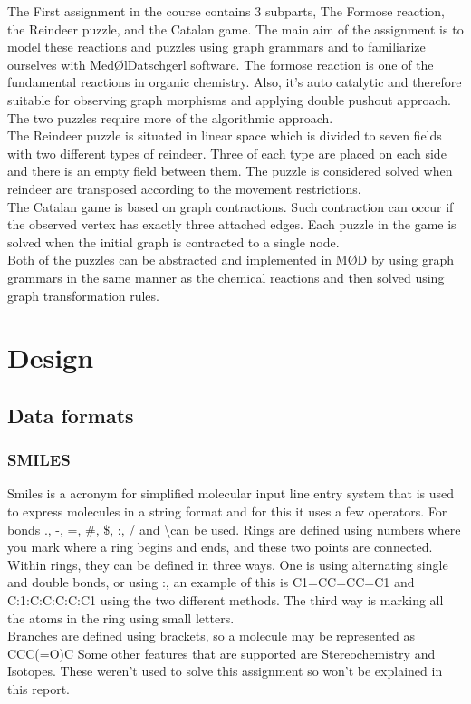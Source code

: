 \documentclass[a4paper,10pt,titlepage]{report}
\begin{document}
The First assignment in the course contains 3 subparts, The Formose reaction, the Reindeer puzzle, and the Catalan game. The main aim of the assignment is to model these reactions and puzzles using graph grammars and to familiarize ourselves with MedØlDatschgerl software.
\newline
The formose reaction is one of the fundamental reactions in organic chemistry. Also, it's auto catalytic and therefore suitable for observing graph morphisms and applying double pushout approach. The two puzzles require more of the algorithmic approach.
\\
The Reindeer puzzle is situated in linear space which is divided to seven fields with two different types of reindeer. Three of each type are placed on each side and there is an empty field between them. The puzzle is considered solved when reindeer are transposed according to the movement restrictions.
\\
The Catalan game is based on graph contractions. Such contraction can occur if the observed vertex has exactly three attached edges. Each puzzle in the game is solved when the initial graph is contracted to a single node.
\\
Both of the puzzles can be abstracted and implemented in MØD by using graph grammars in the same manner as the chemical reactions and then solved using graph transformation rules. 
\\

\section{Design}
\subsection{Data formats}
\subsubsection{SMILES}
Smiles is a acronym for simplified molecular input line entry system that is used to express molecules in a string format and for this it uses a few operators. For bonds ., -, =, #, \$, :, / and \textbackslash can be used.
Rings are defined using numbers where you mark where a ring begins and ends, and these two points are connected. Within rings, they can be defined in three ways. One is using alternating single and double bonds, or using :, an example of this is  C1=CC=CC=C1 and C:1:C:C:C:C:C1 using the two different methods.
The third way is marking all the atoms in the ring using small letters.\\
Branches are defined using brackets, so a molecule may be represented as CCC(=O)C
Some other features that are supported are Stereochemistry and Isotopes. These weren't used to solve this assignment so won't be explained in this report.
\end{document}
